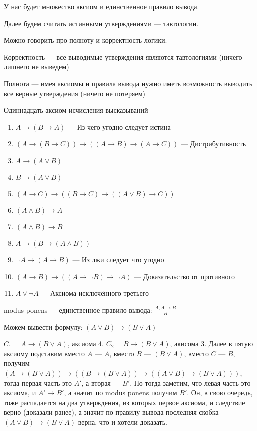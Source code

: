 У нас будет множество аксиом и единственное правило вывода.

Далее будем считать истинными утверждениями --- тавтологии.

Можно говорить про полноту и корректность логики.

\begin{definition}
	Корректность --- все выводимые утверждения являются тавтологиями (ничего лишнего не выведем)

	Полнота --- имея аксиомы и правила вывода нужно иметь возможность выводить все верные утверждения (ничего не потеряем)
\end{definition}

\begin{definition}
Одиннадцать аксиом исчисления высказываний 
\begin{enumerate}
	\item{$A \to (B \to A)$ --- Из чего угодно следует истина}
	\item{$(A \to (B \to C)) \to ((A \to B) \to (A \to C)) $ --- Дистрибутивность}
	\item{$A \to (A \lor B)$}
	\item{$B \to (A \lor B)$}
	\item{$(A \to C) \to ((B \to C) \to ((A \lor B) \to C))$}
	\item{$(A \land B) \to A$}
	\item{$(A \land B) \to B$}
	\item{$A \to (B \to (A \land B))$}
	\item{$\lnot A \to (A \to B)$ --- Из лжи следует что угодно}
	\item{$(A \to B) \to ((A \to \lnot B) \to \lnot A)$ --- Доказательство от противного }
	\item{$A \lor \lnot A$ --- Аксиома исключённого третьего}
\end{enumerate}
\end{definition}

\begin{definition}
	modus ponens --- единственное правило вывода: $\frac{A, A \to B}{B}$
\end{definition}

\begin{example}
Можем вывести формулу: $(A \lor B) \to (B \lor A)$

$C_1 = A \to (B \lor A)$, аксиома 4. $C_2 = B \to (B \lor A)$, акисома 3. Далее в пятую аксиому подставим вместо $A$ --- $A$, вместо $B$ --- $(B \lor A)$, вместо $C$ --- $B$, получим $(A \to (B \lor A)) \to ((B \to (B \lor A)) \to ((A \lor B) \to (B \lor A)))$, тогда первая часть это $A'$, а вторая --- $B'$. Но тогда заметим, что левая часть это аксиома, и $A' \to B'$, а значит по modus ponens получим $B'$. Он, в свою очередь, тоже распадается на два утверждения, из которых первое аксиома, и следствие верно (доказали ранее), а значит по правилу вывода последняя скобка $(A \lor B) \to (B \lor A)$ верна, что и хотели доказать.
\end{example}

